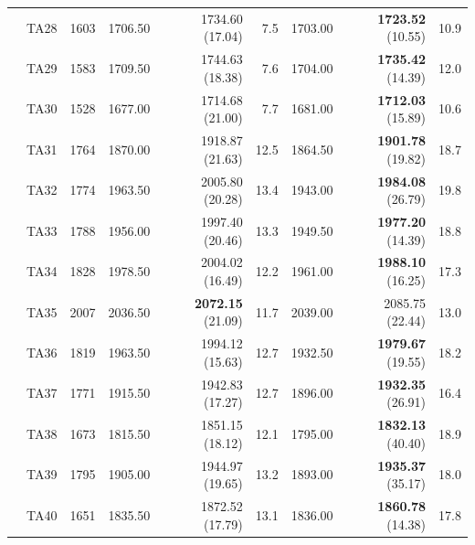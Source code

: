 \documentclass[icae]{iosart2x}
\begin{document}
\begin{appendix}
\begin{table}[htb]
\begin{tabular}{c|c|c|rrr|rrr}
 & TA28 & 1603 & 1706.50 & 1734.60 \tiny{(17.04)} & 7.5 & 1703.00 & \textbf{1723.52} \tiny{(10.55)} & 10.9\\
 & TA29 & 1583 & 1709.50 & 1744.63 \tiny{(18.38)} & 7.6 & 1704.00 & \textbf{1735.42} \tiny{(14.39)} & 12.0\\
 & TA30 & 1528 & 1677.00 & 1714.68 \tiny{(21.00)} & 7.7 & 1681.00 & \textbf{1712.03} \tiny{(15.89)} & 10.6\\
\midrule
\parbox[t]{2mm}{}
 & TA31 & 1764 & 1870.00 & 1918.87 \tiny{(21.63)} & 12.5 & 1864.50 & \textbf{1901.78} \tiny{(19.82)} & 18.7\\
 & TA32 & 1774 & 1963.50 & 2005.80 \tiny{(20.28)} & 13.4 & 1943.00 & \textbf{1984.08} \tiny{(26.79)} & 19.8\\
 & TA33 & 1788 & 1956.00 & 1997.40 \tiny{(20.46)} & 13.3 & 1949.50 & \textbf{1977.20} \tiny{(14.39)} & 18.8\\
 & TA34 & 1828 & 1978.50 & 2004.02 \tiny{(16.49)} & 12.2 & 1961.00 & \textbf{1988.10} \tiny{(16.25)} & 17.3\\
 & TA35 & 2007 & 2036.50 & \textbf{2072.15} \tiny{(21.09)} & 11.7 & 2039.00 & 2085.75 \tiny{(22.44)} & 13.0\\
 & TA36 & 1819 & 1963.50 & 1994.12 \tiny{(15.63)} & 12.7 & 1932.50 & \textbf{1979.67} \tiny{(19.55)} & 18.2\\
 & TA37 & 1771 & 1915.50 & 1942.83 \tiny{(17.27)} & 12.7 & 1896.00 & \textbf{1932.35} \tiny{(26.91)} & 16.4\\
 & TA38 & 1673 & 1815.50 & 1851.15 \tiny{(18.12)} & 12.1 & 1795.00 & \textbf{1832.13} \tiny{(40.40)} & 18.9\\
 & TA39 & 1795 & 1905.00 & 1944.97 \tiny{(19.65)} & 13.2 & 1893.00 & \textbf{1935.37} \tiny{(35.17)} & 18.0\\
 & TA40 & 1651 & 1835.50 & 1872.52 \tiny{(17.79)} & 13.1 & 1836.00 & \textbf{1860.78} \tiny{(14.38)} & 17.8\\
\bottomrule
\end{tabular}
\end{table}



\end{appendix}
\end{document}
